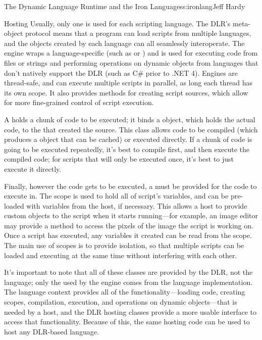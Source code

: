 \begin{aosachapter}{The Dynamic Language Runtime and the Iron Languages}{s:ironlang}{Jeff Hardy}
\begin{aosasect1}{Hosting}
Usually, only one  is used for each scripting language. The
DLR's meta-object protocol means that a program can load scripts from multiple
languages, and the objects created by each language can all seamlessly
interoperate. The engine wraps a language-specific  (such
as  or ) and is used for executing code
from files or strings and performing operations on dynamic objects from
languages that don't natively support the DLR (such as C\# prior to .NET 4).
Engines are thread-safe, and can execute multiple scripts in parallel, as long
each thread has its own scope. It also provides methods for creating script
sources, which allow for more fine-grained control of script execution. 

A  holds a chunk of code to be executed; it binds a
 object, which holds the actual code, to the
 that created the source. This class allows code to be
compiled (which produces a  object that can be cached) or
executed directly. If a chunk of code is going to be executed repeatedly, it's
best to compile first, and then execute the compiled code; for scripts that
will only be executed once, it's best to just execute it directly.

Finally, however the code gets to be executed, a  must be
provided for the code to execute in. The scope is used to hold all of script's
variables, and can be pre-loaded with variables from the host, if necessary.
This allows a host to provide custom objects to the script when it starts
running---for example, an image editor may provide a method to access the
pixels of the image the script is working on. Once a script has executed, any
variables it created can be read from the scope. The main use of scopes is to
provide isolation, so that multiple scripts can be loaded and executing at the
same time without interfering with each other.

It's important to note that all of these classes are provided by the DLR, not
the language; only the  used by the engine comes from the
language implementation. The language context provides all of the
functionality---loading code, creating scopes, compilation, execution, and
operations on dynamic objects---that is needed by a host, and the DLR hosting
classes provide a more usable interface to access that functionality. Because
of this, the same hosting code can be used to host any DLR-based language.


\end{aosasect1}
\end{aosachapter}
